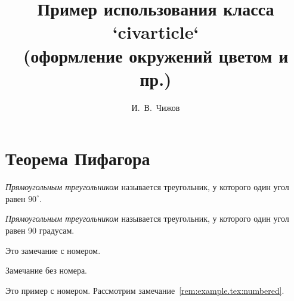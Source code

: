 \documentclass[colorthm, bib]{../civarticle}
\title{
    Пример использования класса `civarticle`\\
    \medskip\Large{(оформление окружений цветом и пр.)}
}
\author{И.~В.~Чижов}
\begin{document}
\blindmathtrue

\maketitle

\begin{abstract}
  \Blindtext[2]
\end{abstract}

\keywords{%
  \Blindtext[1]
}

\tableofcontents
\par
\vspace{3\bigskipamount}
\par

\Blindtext[1]
\section{Теорема Пифагора}
\label{sec:thm-pif}

\begin{definition}\label{def:example.tex:triange}
  \emph{Прямоугольным треугольником} называется треугольник, у
  которого один угол равен \(90^{\circ}\).
\end{definition}

\Blindtext[2]

\begin{definition*}
  \emph{Прямоугольным треугольником} называется треугольник, у
  которого один угол равен 90 градусам.
\end{definition*}

\blindmathtrue\blindmathpaper

\begin{remark} \label{rem:example.tex:numbered}
  Это замечание с номером.
  \blindtext%
\end{remark}

\Blindtext[2]

\begin{remark*}
  Замечание без номера.

  \Blindtext[2]
\end{remark*}

\Blindtext[2]

\begin{example}\label{ex:example:myexample}
  Это пример с номером.
  Рассмотрим замечание~\ref{rem:example.tex:numbered}.
  \Blindtext[2]
\end{example}

\Blindtext[2]
\end{document}
